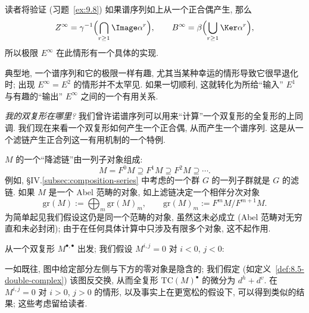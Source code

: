 读者将验证 (习题~\ref{ex:9.8}) 如果谱序列如上从一个正合偶产生, 那么
\[
Z^\infty = \gamma^{-1}\Bigl(\bigcap_{r\ge 1}\Image\alpha^r\Bigr),\qquad
B^\infty = \beta\Bigl(\bigcup_{r\ge 1}\Ker\alpha^r\Bigr),
\]
所以极限 $E^\infty$ 在此情形有一个具体的实现.

典型地, 一个谱序列和它的极限一样有趣, 尤其当某种幸运的情形导致它很早退化时; 出现 $E^\infty=E^2$ 的情形并不太罕见. 如果一切顺利, 这就转化为所给“输入” $E^1$ 与有趣的“输出” $E^\infty$ 之间的一个有用关系.

\medskip
\noindent\emph{我的双复形在哪里?} 我们曾许诺谱序列可以用来“计算”一个双复形的全复形的上同调. 我们现在来看一个双复形如何产生一个正合偶, 从而产生一个谱序列. 这是从一个滤链产生正合列这一有用机制的一个特例.

$M$ 的一个“降滤链”由一列子对象组成:
\[
M=F^0M\supseteq F^1M\supseteq F^2M\supseteq\cdots .
\]
例如, §IV.\ref{subsec:composition-series} 中考虑的一个群 $G$ 的一列子群就是 $G$ 的滤链. 如果 $M$ 是一个 Abel 范畴的对象, 如上滤链决定一个相伴分次对象
\[
\mathrm{gr}(M):=\bigoplus_m \mathrm{gr}(M)_m,\qquad \mathrm{gr}(M)_m:=F^mM/F^{m+1}M.
\]
为简单起见我们假设这仍是同一个范畴的对象, 虽然这未必成立 (Abel 范畴对无穷直和未必封闭); 由于在任何具体计算中只涉及有限多个对象, 这不起作用.

从一个双复形 $M^{\bullet,\bullet}$ 出发; 我们假设 $M^{i,j}=0$ 对 $i<0$, $j<0$:
\begin{center}
\end{center}
一如既往, 图中给定部分左侧与下方的零对象是隐含的; 我们假定 (如定义~\ref{def:8.5-double-complex}) 该图反交换, 从而全复形 $\mathrm{TC}(M)^\bullet$ 的微分为 $d^h+d^v$. 在 $M^{i,j}=0$ 对 $i>0$, $j>0$ 的情形, 以及事实上在更宽松的假设下, 可以得到类似的结果; 这些考虑留给读者.

